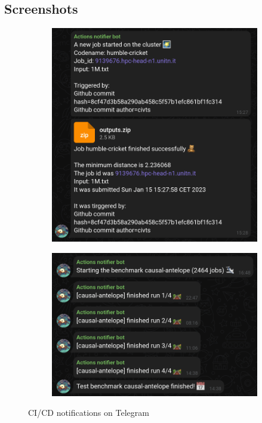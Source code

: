 \subsection{Screenshots}

\begin{figure}[h]
      \centering
      \begin{subfigure}[b]{0.4\linewidth}
            \includegraphics[width=\linewidth]{../assets/images/ci_notification.png}
            \vspace{8pt}
      \end{subfigure}
      \hspace{1cm}
      \begin{subfigure}[b]{0.4\linewidth}
            \includegraphics[width=\linewidth]{../assets/images/benchmark_notifications.png}
            \vspace{8pt}
      \end{subfigure}
      \caption{CI/CD notifications on Telegram}
\end{figure}
